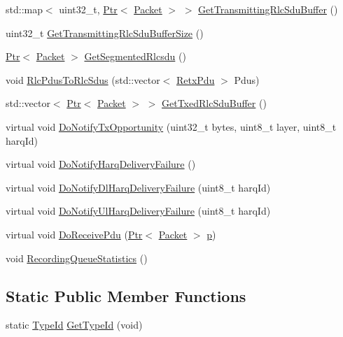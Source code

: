 \begin{DoxyCompactItemize}
std\+::map$<$ uint32\+\_\+t, \hyperlink{classns3_1_1Ptr}{Ptr}$<$ \hyperlink{classns3_1_1Packet}{Packet} $>$ $>$ \hyperlink{classns3_1_1LteRlcAm_a32468907b710027357bbdf356eed0269}{Get\+Transmitting\+Rlc\+Sdu\+Buffer} ()
\item 
uint32\+\_\+t \hyperlink{classns3_1_1LteRlcAm_a372861a3bf9d906259b2ea3be510c524}{Get\+Transmitting\+Rlc\+Sdu\+Buffer\+Size} ()
\item 
\hyperlink{classns3_1_1Ptr}{Ptr}$<$ \hyperlink{classns3_1_1Packet}{Packet} $>$ \hyperlink{classns3_1_1LteRlcAm_ade5a34bf2b99ba28700b9817e1857423}{Get\+Segmented\+Rlcsdu} ()
\item 
void \hyperlink{classns3_1_1LteRlcAm_a5ea384363b8fa99b66f9eaad80edc2cc}{Rlc\+Pdus\+To\+Rlc\+Sdus} (std\+::vector$<$ \hyperlink{structns3_1_1LteRlcAm_1_1RetxPdu}{Retx\+Pdu} $>$ Pdus)
\item 
std\+::vector$<$ \hyperlink{classns3_1_1Ptr}{Ptr}$<$ \hyperlink{classns3_1_1Packet}{Packet} $>$ $>$ \hyperlink{classns3_1_1LteRlcAm_a3777efedcc313f64f8faef54fe9948bd}{Get\+Txed\+Rlc\+Sdu\+Buffer} ()
\item 
virtual void \hyperlink{classns3_1_1LteRlcAm_a3ab44d9541efaa52821f93075eb769f1}{Do\+Notify\+Tx\+Opportunity} (uint32\+\_\+t bytes, uint8\+\_\+t layer, uint8\+\_\+t harq\+Id)
\item 
virtual void \hyperlink{classns3_1_1LteRlcAm_a1efc72691a3f83ccda062e7b5cf2aee1}{Do\+Notify\+Harq\+Delivery\+Failure} ()
\item 
virtual void \hyperlink{classns3_1_1LteRlcAm_a085e4843fe3c0602f1c57c490e69d39e}{Do\+Notify\+Dl\+Harq\+Delivery\+Failure} (uint8\+\_\+t harq\+Id)
\item 
virtual void \hyperlink{classns3_1_1LteRlcAm_a5d76a0a292a53e1bb7591cc90ef6b586}{Do\+Notify\+Ul\+Harq\+Delivery\+Failure} (uint8\+\_\+t harq\+Id)
\item 
virtual void \hyperlink{classns3_1_1LteRlcAm_a9351b349aef796a3cda5946574e9435f}{Do\+Receive\+Pdu} (\hyperlink{classns3_1_1Ptr}{Ptr}$<$ \hyperlink{classns3_1_1Packet}{Packet} $>$ \hyperlink{lte__link__budget__x2__handover__measures_8m_ac9de518908a968428863f829398a4e62}{p})
\item 
void \hyperlink{classns3_1_1LteRlcAm_a68bcab2d7b245b5efacac3198ef78ba2}{Recording\+Queue\+Statistics} ()
\end{DoxyCompactItemize}
\subsection*{Static Public Member Functions}
\begin{DoxyCompactItemize}
\item 
static \hyperlink{classns3_1_1TypeId}{Type\+Id} \hyperlink{classns3_1_1LteRlcAm_a28143176a465769583d9db0b4b36b91b}{Get\+Type\+Id} (void)
\end{DoxyCompactItemize}
